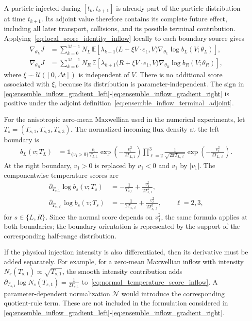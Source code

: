 \documentclass[12pt,nopreprintline]{elsarticle}
\begin{document}
A particle injected during $[t_k,t_{k+1}]$ is already part of the particle distribution at time $t_{k+1}$. Its adjoint value therefore contains its complete future effect, including all later transport, collisions, and its possible terminal contribution. Applying~\eqref{eq:local_score_identity_inflow} locally to each boundary source gives
\begin{align}
\nabla_{\theta_L}J
&=
\sum_{k=0}^{M-1}N_L\,
\mathbb E\left[
\lambda_{k+1}
\bigl(L+\xi V\cdot e_1,V\bigr)
\nabla_{\theta_L}\log b_L(V;\theta_L)
\right],
\label{eq:ensemble_inflow_gradient_left}
\\
\nabla_{\theta_R}J
&=
\sum_{k=0}^{M-1}N_R\,
\mathbb E\left[
\lambda_{k+1}
\bigl(R+\xi V\cdot e_1,V\bigr)
\nabla_{\theta_R}\log b_R(V;\theta_R)
\right],
\label{eq:ensemble_inflow_gradient_right}
\end{align}
where $\xi\sim\mathcal U([0,\Delta t])$ is independent of $V$. There is no additional score associated with $\xi$, because its distribution is parameter-independent. The sign in
\eqref{eq:ensemble_inflow_gradient_left}-\eqref{eq:ensemble_inflow_gradient_right} is positive under the adjoint
definition~\eqref{eq:ensemble_inflow_terminal_adjoint}.


For the anisotropic zero-mean Maxwellian used in the numerical experiments, let $T_s=(T_{s,1},T_{s,2},T_{s,3})$. The normalized incoming flux density at the left boundary is
\begin{align}
b_L(v;T_L)
&=
\mathds{1}_{\{v_1>0\}}
\frac{v_1}{T_{L,1}}
\exp\left(-\frac{v_1^2}{2T_{L,1}}\right)
\prod_{\ell=2}^3
\frac{1}{\sqrt{2\pi T_{L,\ell}}}
\exp\left(-\frac{v_\ell^2}{2T_{L,\ell}}\right).
\label{eq:left_half_range_flux_density}
\end{align}
At the right boundary, $v_1>0$ is replaced by $v_1<0$ and $v_1$ by $|v_1|$. The componentwise temperature scores are
\begin{align}
\partial_{T_{s,1}}\log b_s(v;T_s)
&=
-\frac{1}{T_{s,1}}
+\frac{v_1^2}{2T_{s,1}^2},
\label{eq:normal_temperature_score_inflow}
\\
\partial_{T_{s,\ell}}\log b_s(v;T_s)
&=
-\frac{1}{2T_{s,\ell}}
+\frac{v_\ell^2}{2T_{s,\ell}^2},
\qquad \ell=2,3,
\label{eq:tangential_temperature_score_inflow}
\end{align}
for $s\in\{L,R\}$. Since the normal score depends on $v_1^2$, the same formula applies at both boundaries; the boundary orientation is represented by the support of the corresponding half-range distribution.

If the physical injection intensity is also differentiated, then its derivative must be added separately. For example, for a zero-mean Maxwellian inflow with intensity $N_s(T_{s,1})\propto\sqrt{T_{s,1}}$, the smooth intensity contribution adds
\(
\partial_{T_{s,1}}\log N_s(T_{s,1})
=\frac{1}{2T_{s,1}}
\)
to~\eqref{eq:normal_temperature_score_inflow}. A parameter-dependent normalization $\mathcal N$ would introduce the corresponding quotient-rule term. These are not included in the formulation considered in
\eqref{eq:ensemble_inflow_gradient_left}-\eqref{eq:ensemble_inflow_gradient_right}.
\end{document}
